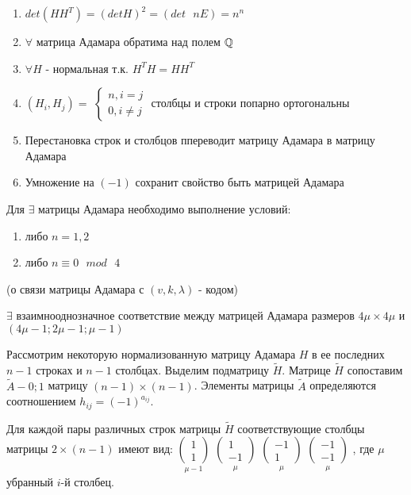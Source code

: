 \prop
\begin{enumerate}
	\item $det(HH^T) = (detH)^2 = (det \text{ } nE) = n^n$
	\item $\forall$ матрица Адамара обратима над полем $\mathbb{Q}$
	\item $\forall H$ - нормальная т.к. $H^TH = HH^T$
	\item $(H_i, H_j) = $
	$\begin{cases}
		n, i = j \\
		0, i \neq j
	\end{cases}$
	столбцы и строки попарно ортогональны
	\item Перестановка строк и столбцов ппереводит матрицу Адамара в матрицу Адамара
	\item Умножение на $(-1)$ сохранит свойство быть матрицей Адамара
\end{enumerate}

\thr
Для $\exists$ матрицы Адамара необходимо выполнение условий:
\begin{enumerate}
	\item либо $n = 1,2$
	\item либо $n \equiv 0 \text{ } mod \text{ } 4$
\end{enumerate}

\thr (о связи матрицы Адамара с $(v, k, \lambda)$ - кодом)

$\exists$ взаимнооднозначное соответствие между матрицей Адамара размеров $4\mu \times 4\mu$
и $(4\mu - 1; 2\mu - 1; \mu - 1)$

\proof
Рассмотрим некоторую нормализованную матрицу Адамара $H$ в ее последних $n - 1$ строках
и $n - 1$ столбцах. Выделим подматрицу $\tilde{H}$. Матрице $\tilde{H}$ сопоставим $\tilde{A} - 0;1$
матрицу $(n - 1)\times (n - 1)$. Элементы  матрицы $\tilde{A}$ определяются соотношением
$h_{ij} = (-1)^{a_{ij}}$.

Для каждой пары различных строк матрицы $\tilde{H}$ соответствующие столбцы матрицы $2\times (n - 1)$
имеют вид: 
$\underset{
\mu - 1
}{
\begin{pmatrix}
	1 \\
	1
\end{pmatrix}	
}$
$\underset{
\mu
}{
\begin{pmatrix}
	1 \\
	-1
\end{pmatrix}	
}$
$\underset{
\mu
}{
\begin{pmatrix}
	-1 \\
	1
\end{pmatrix}	
}$
$\underset{
\mu
}{
\begin{pmatrix}
	-1 \\
	-1
\end{pmatrix}	
}$
, где $\mu$ убранный $i$-й столбец.

